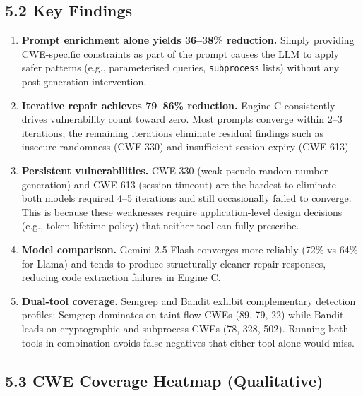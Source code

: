 \documentclass[11pt,a4paper]{article}
\begin{document}
\subsection{5.2 \enspace Key Findings}

\begin{enumerate}[leftmargin=*, nosep]
  \item \textbf{Prompt enrichment alone yields 36–38\% reduction.} Simply providing CWE-specific constraints as part of the prompt causes the LLM to apply safer patterns (e.g., parameterised queries, \texttt{subprocess} lists) without any post-generation intervention.

  \item \textbf{Iterative repair achieves 79–86\% reduction.} Engine C consistently drives vulnerability count toward zero. Most prompts converge within 2–3 iterations; the remaining iterations eliminate residual findings such as insecure randomness (CWE-330) and insufficient session expiry (CWE-613).

  \item \textbf{Persistent vulnerabilities.} CWE-330 (weak pseudo-random number generation) and CWE-613 (session timeout) are the hardest to eliminate — both models required 4–5 iterations and still occasionally failed to converge. This is because these weaknesses require application-level design decisions (e.g., token lifetime policy) that neither tool can fully prescribe.

  \item \textbf{Model comparison.} Gemini 2.5 Flash converges more reliably (72\% vs 64\% for Llama) and tends to produce structurally cleaner repair responses, reducing code extraction failures in Engine C.

  \item \textbf{Dual-tool coverage.} Semgrep and Bandit exhibit complementary detection profiles: Semgrep dominates on taint-flow CWEs (89, 79, 22) while Bandit leads on cryptographic and subprocess CWEs (78, 328, 502). Running both tools in combination avoids false negatives that either tool alone would miss.
\end{enumerate}

\subsection{5.3 \enspace CWE Coverage Heatmap (Qualitative)}
\end{document}
